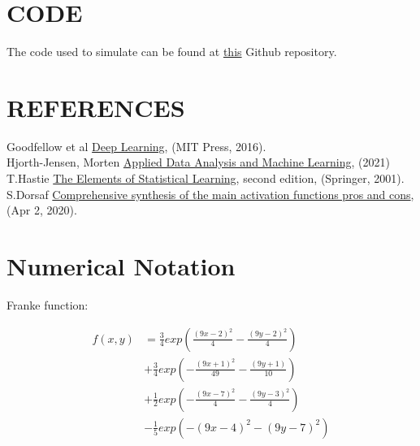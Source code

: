 \documentclass[english,notitlepage,reprint,nofootinbib]{revtex4-1}  %
\begin{document}
\section{CODE}\label{sec:CODE}
The code used to simulate can be found at \href{https://github.com/erlend1202/FYS_STK4155_Prosjekt_2}{this} Github repository.

\section{REFERENCES}\label{sec:REF}
Goodfellow et al \href{https://www.deeplearningbook.org/}{Deep Learning}, (MIT Press, 2016).\label{ref:Goodfellow et al}
\\
Hjorth-Jensen, Morten \href{https://compphysics.github.io/MachineLearning/doc/LectureNotes/_build/html/intro.html}{Applied Data Analysis and Machine Learning}, (2021) \label{ref:Morten}
\\
T.Hastie \href{https://hastie.su.domains/Papers/ESLII.pdf}{The Elements of Statistical Learning}, second edition, (Springer, 2001).\label{ref:HASTIE}
\\
S.Dorsaf \href{https://medium.com/analytics-vidhya/comprehensive-synthesis-of-the-main-activation-functions-pros-and-cons-dab105fe4b3b}{Comprehensive synthesis of the main activation functions pros and cons}, (Apr 2, 2020).\label{ref:DORSAF}




\appendix

\section{Numerical Notation}\label{sec:NOTATION}
\caption{Franke function:}
\label{eq:FrankeFunction}
\begin{align*}
    f(x,y) &= \frac{3}{4} exp \left( \frac{(9x -2)^2}{4} - \frac{(9y -2)^2}{4}  \right) \\
    &+  \frac{3}{4} exp \left( -\frac{(9x + 1)^2}{49} - \frac{(9y + 1)}{10} \right) \\
    &+ \frac{1}{2} exp \left( -\frac{(9x -7)^2}{4} - \frac{(9y - 3)^2}{4} \right) \\
    &- \frac{1}{5} exp \left( - (9x - 4)^2 - (9y - 7)^2 \right)
\end{align*}
\end{document}

